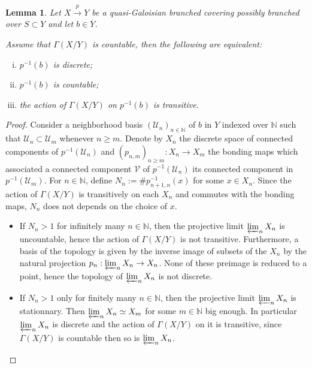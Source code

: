 \documentclass[a4paper,12pt]{article}
\newtheorem{lem}{Lemma}[section]          %
\def\U{\mathcal U}
\def\V{\mathcal V}
\def\N{\mathbb N}
\def\V{\mathcal V}
\def\N{\mathbb{N}}
\def\U{\mathcal{U}}
\begin{document}
\begin{lem} \label{lem:alternative_countable}
 Let $X\xrightarrow{p} Y$ be a quasi-Galoisian branched covering possibly branched over $S\subset Y$ and let $b\in Y$. 
 
 Assume that $\Gamma(X/Y)$ is countable, then the following are equivalent:
 \begin{enumerate}[(i)]
  \item $p^{-1}(b)$ is discrete;
  \item $p^{-1}(b)$ is countable;
  \item the action of $\Gamma(X/Y)$ on $p^{-1}(b)$ is transitive.
 \end{enumerate}

\end{lem}
\begin{proof}
 Consider a neighborhood basis $(\U_n)_{n\in \N}$ of $b$ in $Y$ indexed over $\N$ such that $\U_n\subset \U_m$ whenever $n\geq m$. Denote by $X_n$ the discrete space of connected components of $p^{-1}(\U_n)$ and $(p_{n,m})_{n\geq m}: X_n \rightarrow X_m$ the bonding maps which associated a connected component $\V$ of $p^{-1}(\U_n)$
 its connected component in $p^{-1}(\U_m)$.
 For $n\in\N$, define $N_n := \#p_{n+1,n}^{-1}(x)$ for some $x\in X_n$. Since the action of $\Gamma(X/Y)$ is transitively on each $X_n$ and commutes with the bonding maps, $N_n$ does not depends on the choice of $x$.
 \begin{itemize}
  \item  If $N_n>1$ for infinitely many $n\in \N$, then the projective limit $\varprojlim_n X_n$ is uncountable, hence the action of $\Gamma(X/Y)$ is not transitive. Furthermore, a basis of the topology is given by the inverse image of   subsets of the $X_n$ by the natural projection $p_n : \varprojlim_n X_n \rightarrow X_n$. None of these preimage is reduced to a point, hence the topology of $\varprojlim_n X_n$ is not discrete.
  \item  If $N_n> 1$ only for finitely many $n\in \N$, then the projective limit  $\varprojlim_n X_n$ is  stationnary. Then $\varprojlim_n X_n \simeq X_m$ for some $m\in \N$ big enough. In particular $\varprojlim_n X_n$ is discrete and the action of $\Gamma(X/Y)$ on it is transitive, since $\Gamma(X/Y)$ is countable then so is $\varprojlim_n X_n$. 
 \end{itemize}


 

\end{proof}
\end{document}
